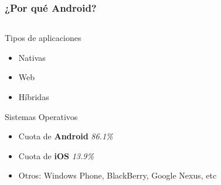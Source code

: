 \documentclass[usenames,dvipsnames]{beamer}
\begin{document}
\begin{frame} 
\frametitle{¿Por qué Android?}
  \begin{columns}
  \begin{column}{0.6\textwidth}
    \center \textcolor{UniGold}{Tipos de aplicaciones}
    \begin{itemize}
      \item Nativas
      \item Web
      \item Híbridas
    \end{itemize}
    \pause
    \center \textcolor{UniGold}{Sistemas Operativos}
    \begin{itemize}
      \item Cuota de \textbf{Android} \emph{86.1\%}
      \item Cuota de \textbf{iOS} \emph{13.9\%}
      \item Otros: Windows Phone, BlackBerry, Google Nexus, etc
    \end{itemize}
  \end{column}
  \begin{column}{0.4\textwidth}
\end{column}
\end{columns}
\end{frame}
\end{document}
